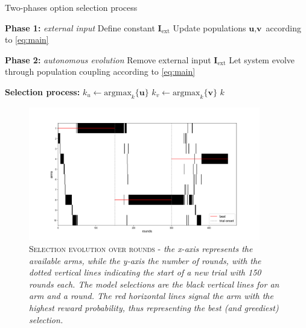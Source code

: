 \begin{algorithm}[H]
\caption{Two-phases option selection process}
\label{alg:decision}
\SetAlgoLined
{}


\textbf{Phase 1:} \textit{external input} 
Define constant $\textbf{I}_{\text{ext}}$\;
Update populations $\textbf{u}, \textbf{v}$ according to \ref{eq:main}\;

\textbf{Phase 2:} \textit{autonomous evolution} 
Remove external input $\textbf{I}_{\text{ext}}$\;
Let system evolve through population coupling according to \ref{eq:main}\;

\textbf{Selection process:}\;
$k_{u} \gets \text{argmax}_{k}\{\textbf{u}\}$\;
$k_{v} \gets \text{argmax}_{k}\{\textbf{v}\}$\;
\Return $k$
\end{algorithm}

%
\begin{figure}[ht]
    \centering
    \includegraphics[width=0.9\textwidth]{figures/selections_1.png}
    \caption{\textsc{Selection evolution over rounds} - \textit{the x-axis represents the available arms, while the y-axis the number of rounds, with the dotted vertical lines indicating the start of a new trial with 150 rounds each. The model selections are the black vertical lines for an arm and a
    round. The red horizontal lines signal the arm with the highest reward probability, thus representing the best (and greediest) selection.}}
    \label{fig:sel1}
\end{figure}

